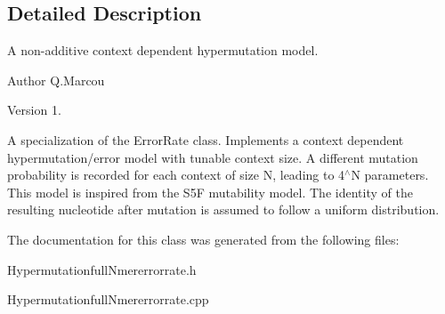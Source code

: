 \subsection{Detailed Description}
A non-\/additive context dependent hypermutation model. 

\begin{DoxyAuthor}{Author}
Q.\+Marcou 
\end{DoxyAuthor}
\begin{DoxyVersion}{Version}
1.
\end{DoxyVersion}
A specialization of the Error\+Rate class. Implements a context dependent hypermutation/error model with tunable context size. A different mutation probability is recorded for each context of size N, leading to 4$^\wedge$N parameters. This model is inspired from the S5F mutability model. The identity of the resulting nucleotide after mutation is assumed to follow a uniform distribution. 

The documentation for this class was generated from the following files\+:\begin{DoxyCompactItemize}
\item 
Hypermutationfull\+Nmererrorrate.\+h\item 
Hypermutationfull\+Nmererrorrate.\+cpp\end{DoxyCompactItemize}
